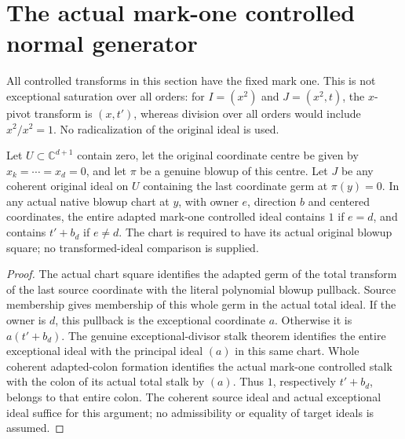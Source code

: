 \section{The actual mark-one controlled normal generator}

All controlled transforms in this section have the fixed mark one. This is
not exceptional saturation over all orders: for $I=(x^2)$ and $J=(x^2,t)$,
the $x$-pivot transform is $(x,t')$, whereas division over all orders would
include $x^2/x^2=1$. No radicalization of the original ideal is used.

\begin{lemma}
\label{hir:disjoint-controlled-normal-quotient}
\leanok
Let $U\subset\mathbb C^{d+1}$ contain zero, let the original coordinate centre
be given by $x_k=\cdots=x_d=0$, and let $\pi$ be a genuine blowup of this
centre. Let $J$ be any coherent original ideal on $U$ containing the last
coordinate germ at $\pi(y)=0$. In any actual native blowup chart at $y$,
with owner $e$, direction $b$ and centered coordinates, the entire adapted
mark-one controlled ideal contains $1$ if $e=d$, and contains $t'+b_d$
if $e\ne d$. The chart is required to have its actual original blowup square;
no transformed-ideal comparison is supplied.
\end{lemma}
\begin{proof}
The actual chart square identifies the adapted germ of the total transform
of the last source coordinate with the literal polynomial blowup pullback.
Source membership gives membership of this whole germ in the actual total
ideal. If the owner is $d$, this pullback is the exceptional coordinate $a$.
Otherwise it is $a(t'+b_d)$. The genuine exceptional-divisor stalk theorem
identifies the entire exceptional ideal with the principal ideal $(a)$ in
this same chart. Whole coherent adapted-colon formation identifies the
actual mark-one controlled stalk with the colon of its actual total stalk
by $(a)$. Thus $1$, respectively $t'+b_d$, belongs to that entire colon.
The coherent source ideal and actual exceptional ideal suffice for this
argument; no admissibility or equality of target ideals is assumed.
\end{proof}

